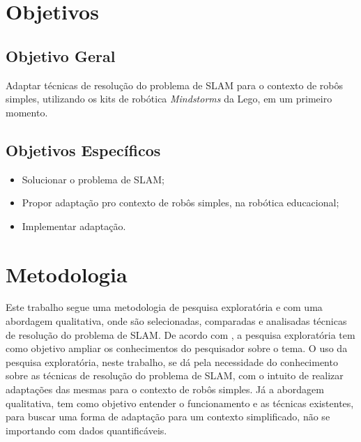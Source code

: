 	\section{Objetivos}

	\subsection{Objetivo Geral} %
	\label{sub:objetivos_gerais}
	
		Adaptar técnicas de resolução do problema de SLAM para o contexto de robôs simples, utilizando os kits de robótica \textit{Mindstorms} da Lego, em um primeiro momento.


	\subsection{Objetivos Específicos} %
	\label{sub:objetivos_específicos}
		 
	\begin{itemize}
		\item Solucionar o problema de SLAM;
		\item Propor adaptação pro contexto de robôs simples, na robótica educacional;
		\item Implementar adaptação.
	\end{itemize}
	

	\section[Metodologia]{Metodologia}

Este trabalho segue uma metodologia de pesquisa exploratória e com uma abordagem qualitativa, onde são selecionadas, comparadas e analisadas técnicas de resolução do problema de SLAM. De acordo com \cite{metodologiaCientifica}, a pesquisa exploratória tem como objetivo ampliar os conhecimentos do pesquisador sobre o tema. O uso da pesquisa exploratória, neste trabalho, se dá pela necessidade do conhecimento sobre as técnicas de resolução do problema de SLAM, com o intuito de realizar adaptações das mesmas para o contexto de robôs simples. Já a abordagem qualitativa, tem como objetivo entender o funcionamento e as técnicas existentes, para buscar uma forma de adaptação para um contexto simplificado, não se importando com dados quantificáveis.

